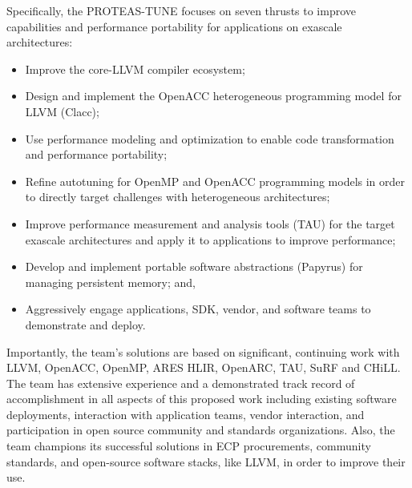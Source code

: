 Specifically, the PROTEAS-TUNE focuses on seven thrusts to improve capabilities and performance portability for applications on exascale architectures: 

\begin{itemize}
\item 
    Improve the core-LLVM compiler ecosystem; 
\item 
	Design and implement the OpenACC heterogeneous programming model for LLVM (Clacc);
\item 
	Use performance modeling and optimization to enable code transformation and performance portability;
\item 
	Refine autotuning for OpenMP and OpenACC programming models in order to directly target challenges with heterogeneous architectures;
\item 
    Improve performance measurement and analysis tools (TAU) for the target exascale architectures and apply it to applications to improve performance;
\item 
    Develop and implement portable software abstractions (Papyrus) for managing persistent memory; and,
\item 
    Aggressively engage applications, SDK, vendor, and software teams to demonstrate and deploy.
    
\end{itemize}

Importantly, the team’s solutions are based on significant, continuing work with LLVM, OpenACC, OpenMP, ARES HLIR, OpenARC, TAU, SuRF and CHiLL. The team has extensive experience and a demonstrated track record of accomplishment in all aspects of this proposed work including existing software deployments, interaction with application teams, vendor interaction, and participation in open source community and standards organizations. Also, the team champions its successful solutions in ECP procurements, community standards, and open-source software stacks, like LLVM, in order to improve their use.

